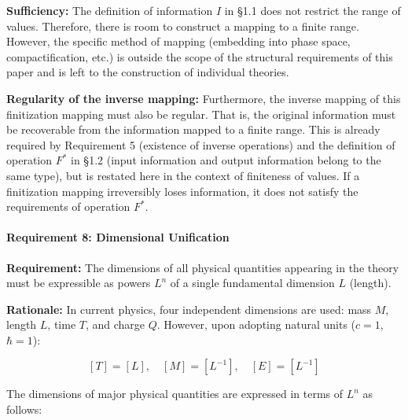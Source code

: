 \documentclass[a4paper,11pt]{article}
\begin{document}
\textbf{Sufficiency:} The definition of information \(I\) in §1.1 does
not restrict the range of values. Therefore, there is room to construct
a mapping to a finite range. However, the specific method of mapping
(embedding into phase space, compactification, etc.) is outside the
scope of the structural requirements of this paper and is left to the
construction of individual theories.

\textbf{Regularity of the inverse mapping:} Furthermore, the inverse
mapping of this finitization mapping must also be regular. That is, the
original information must be recoverable from the information mapped to
a finite range. This is already required by Requirement 5 (existence of
inverse operations) and the definition of operation \(F^*\) in §1.2
(input information and output information belong to the same type), but
is restated here in the context of finiteness of values. If a
finitization mapping irreversibly loses information, it does not satisfy
the requirements of operation \(F^*\).

\paragraph{Requirement 8: Dimensional
Unification}\label{requirement-8-dimensional-unification}

\textbf{Requirement:} The dimensions of all physical quantities
appearing in the theory must be expressible as powers \(L^n\) of a
single fundamental dimension \(L\) (length).

\textbf{Rationale:} In current physics, four independent dimensions are
used: mass \(M\), length \(L\), time \(T\), and charge \(Q\). However,
upon adopting natural units (\(c = 1\), \(\hbar = 1\)):

\[[T] = [L], \quad [M] = [L^{-1}], \quad [E] = [L^{-1}]\]

The dimensions of major physical quantities are expressed in terms of
\(L^n\) as follows:
\end{document}
